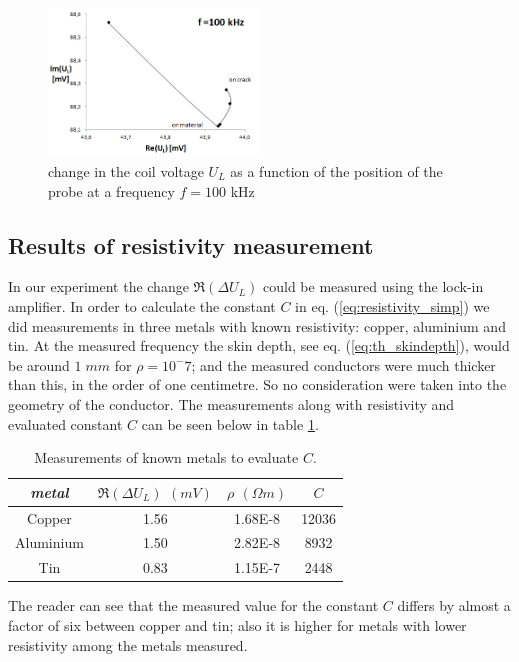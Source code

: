 \begin{figure}[htbp]
	\centering
		\includegraphics[width=0.50\textwidth]{img/crack100kHz}
	\caption{change in the coil voltage $U_L$ as a function of the position of the probe at a frequency $f=100$ kHz}
	\label{fig:crack100kHz}
\end{figure}




\FloatBarrier
\subsection{Results of resistivity measurement}
In our experiment the change $\Re(\Delta U_L)$ could be measured using the lock-in amplifier.
In order to calculate the constant $C$ in eq. (\ref{eq:resistivity_simp}) we did measurements in three metals with known resistivity: copper, aluminium and tin.
At the measured frequency the skin depth, see eq. (\ref{eq:th_skindepth}), would be around $1\;mm$ for 
$\rho=10^-7$; and the measured conductors were much thicker than this, in the order of one centimetre. So no consideration were taken into the geometry of the conductor.
The measurements along with resistivity and evaluated constant $C$ can be seen below in table \ref{table:measurements}.

\begin{table}[h!]
\caption{Measurements of known metals to evaluate $C$.}
\centering
\begin{tabular}{|c|c|c|c|}
\hline 
\emph{metal} & $\Re(\Delta U_L)$ $(mV)$ & $\rho$ $(\Omega m)$ & $C$ \\ 
\toprule[2pt] 
Copper & 1.56 & 1.68E-8 & 12036 \\ 
\hline 
Aluminium & 1.50  & 2.82E-8 & 8932 \\ 
\hline 
Tin & 0.83  & 1.15E-7 & 2448 \\ 
\hline 
\end{tabular}
\label{table:measurements}
\end{table}
The reader can see that the measured value for the constant $C$ differs by almost a factor of six between
copper and tin; also it is higher for metals with lower resistivity among the metals measured.

